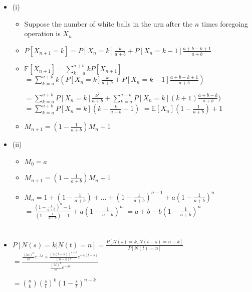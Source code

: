 \documentclass[a4paper]{article}
\begin{document}
\section{}
\begin{itemize}
\begin{figure} [H]
    \texttt{[image: question/7.png]}
\end{figure}
    \item (i)
        \begin{itemize}
            \item Suppose the number of white balls in the urn after the $n$ times foregoing operation is $X_n$
            \item $P[X_{n+1} = k] = P[X_n = k] \frac{k}{a+b} + P[X_n = k-1] \frac{a+b-k+1}{a+b}$
            \item $\mathbb{E}[X_{n+1}] = \sum_{k=a}^{a+b} k P[X_{n+1}]$
                $= \sum_{k=a}^{a+b} k (P[X_n = k] \frac{k}{a+b} + P[X_n = k-1] \frac{a+b-k+1}{a+b})$

                $= \sum_{k=a}^{a+b} P[X_n = k] \frac{k^2}{a+b} + \sum_{k=a}^{a+b} P[X_n = k] (k+1) \frac{a+b-k}{a+b})$
                $= \sum_{k=a}^{a+b} P[X_n = k] (k - \frac{k}{a+b} + 1)$
                $= \mathbb{E}[X_n] (1-\frac{1}{a+b}) + 1$
            \item $M_{n+1} = (1-\frac{1}{a+b})M_n + 1$
        \end{itemize}
    \item (ii)
        \begin{itemize}
            \item $M_0 = a$ 
            \item $M_{n+1} = (1-\frac{1}{a+b})M_n + 1$
            \item $M_n = 1 + (1-\frac{1}{a+b}) + \dots + (1-\frac{1}{a+b})^{n-1} + a(1-\frac{1}{a+b})^n$
                $= \frac{(1-\frac{1}{a+b})^n - 1}{(1-\frac{1}{a+b}) - 1} + a(1-\frac{1}{a+b})^n$
                $= a + b - b(1-\frac{1}{a+b})^n$
        \end{itemize}
\end{itemize}

\section{}
\begin{itemize}
\begin{figure} [H]
    \texttt{[image: question/8.png]}
\end{figure}
    \item $P[N(s) = k| N(t) = n] = \frac{P[N(s) = k, N(t-s) = n-k]}{P[N(t) = n]}$
        $= \frac{\frac{(\lambda s)^k}{k!}e^{-\lambda s} \times \frac{(\lambda (t-s))^{n-k}}{(n-k)!}e^{-\lambda (t-s)}}{\frac{(\lambda t)^n}{n!}e^{-\lambda t}}$

        $= \binom{n}{k} (\frac{s}{t})^k (1 - \frac{s}{t})^{n-k}$
\end{itemize}
\end{document}
